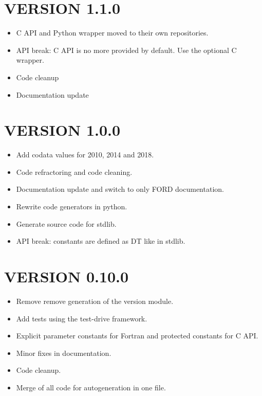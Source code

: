 \section*{VERSION 1.1.0}
\begin{itemize}
\item C API and Python wrapper moved to their own repositories.
\item API break: C API is no more provided by default. Use the optional C
wrapper.
\item Code cleanup
\item Documentation update
\end{itemize}



\section*{VERSION 1.0.0}
\begin{itemize}
\item Add codata values for 2010, 2014 and 2018.
\item Code refractoring and code cleaning.
\item Documentation update and switch to only FORD documentation.
\item Rewrite code generators in python.
\item Generate source code for stdlib.
\item API break: constants are defined as DT like in stdlib.
\end{itemize}



\section*{VERSION 0.10.0}
\begin{itemize}
\item Remove remove generation of the version module.
\item Add tests using the test-drive framework.
\item Explicit parameter constants for Fortran and protected constants for C API.
\item Minor fixes in documentation.
\item Code cleanup.
\item Merge of all code for autogeneration in one file.
\end{itemize}



